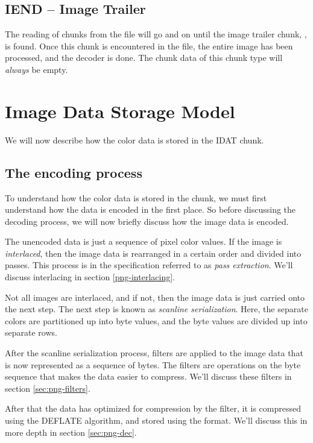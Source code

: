 \subsection{IEND -- Image Trailer}

The reading of chunks from the \png file will go and on until the image
trailer chunk, , is found. Once this chunk is encountered
in the file, the entire image has been processed, and the decoder is
done. The chunk data of this chunk type will \textit{always} be empty.

\section{Image Data Storage Model}
\label{sec:png-image-data-storage}

We will now describe how the color data is stored in the IDAT chunk.

\subsection{The encoding process}

To understand how the color data is stored in the \IDAT chunk, we must
first understand how the data is encoded in the first place. So before
discussing the decoding process, we will now briefly discuss how the
image data is encoded.

The unencoded data is just a sequence of pixel color values. If the
image is \textit{interlaced}, then the image data is rearranged in a
certain order and divided into passes. This process is in the \png
specification referred to as \textit{pass extraction}. We'll discuss
interlacing in section \ref{png-interlacing}.

Not all images are interlaced, and if not, then the image data is just
carried onto the next step. The next step is known as \textit{scanline
  serialization}. Here, the separate colors are partitioned up into
byte values, and the byte values are divided up into separate rows.



After the scanline serialization process, filters are applied to the
image data that is now represented as a sequence of bytes. The filters
are operations on the byte sequence that makes the data easier to
compress. We'll discuss these filters in section
\ref{sec:png-filters}.

After that the data has optimized for compression by the filter, it is
compressed using the DEFLATE algorithm, and stored using the \zlib
format. We'll discuss this in more depth in section \ref{sec:png-dec}.

